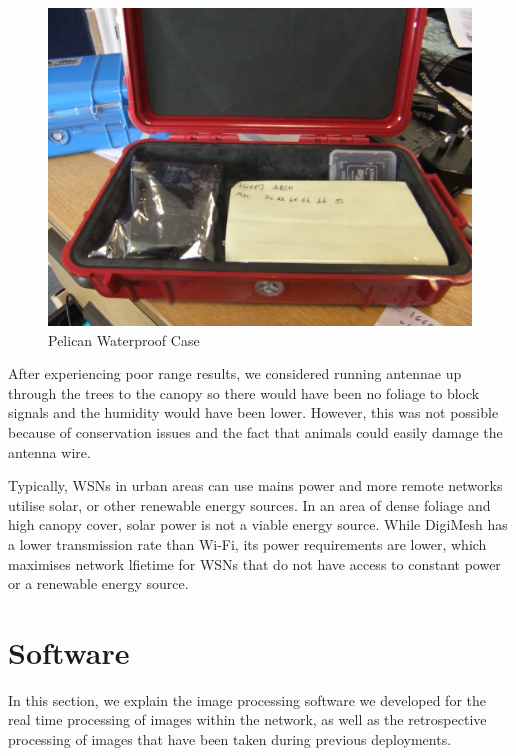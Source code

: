 			\begin{figure}[H]
			\centering
			\includegraphics[width=\textwidth]{Chap3/figures/pelican}
			\caption{Pelican Waterproof Case}
			\label{fig:tech:pelican}
			\end{figure}

	After experiencing poor range results, we considered running antennae up through the trees to the canopy so there would have been no foliage to block signals and the humidity would have been lower. However, this was not possible because of conservation issues and the fact that animals could easily damage the antenna wire.

	Typically, WSNs in urban areas can use mains power and more remote networks utilise solar, or other renewable energy sources. In an area of dense foliage and high canopy cover, solar power is not a viable energy source. While DigiMesh has a lower transmission rate than Wi-Fi, its power requirements are lower, which maximises network lfietime for WSNs that do not have access to constant power or a renewable energy source.

\section{Software}\label{tech:sw}
	In this section, we explain the image processing software we developed for the real time processing of images within the network, as well as the retrospective processing of images that have been taken during previous deployments.

